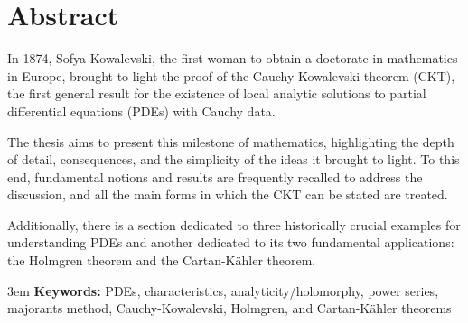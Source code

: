 \chapter*{Abstract}

In 1874, Sofya Kowalevski, the first woman to obtain a doctorate in mathematics in Europe, brought to light the proof of the Cauchy-Kowalevski theorem (CKT), the first general result for the existence of local analytic solutions to partial differential equations (PDEs) with Cauchy data.

\vspace{6mm}
The thesis aims to present this milestone of mathematics, highlighting the depth of detail, consequences, and the simplicity of the ideas it brought to light. To this end, fundamental notions and results are frequently recalled to address the discussion, and all the main forms in which the CKT can be stated are treated.

\vspace{6mm}
Additionally, there is a section dedicated to three historically crucial examples for understanding PDEs and another dedicated to its two fundamental applications: the Holmgren theorem and the Cartan-Kähler theorem.

\vspace{6mm}
\emergencystretch 3em
\textbf{Keywords:} PDEs, characteristics, analyticity/holomorphy, power series, majorants method, Cauchy-Kowalevski, Holmgren, and Cartan-Kähler theorems

\newpage
\blankpage
